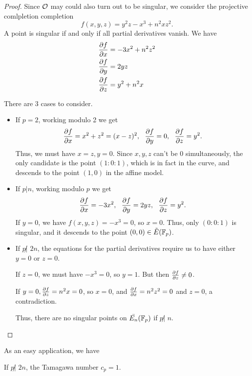 \documentclass[12pt, a4paper]{amsart}
\begin{document}
\begin{proof}
  Since ${\mathcal O}$ may could also turn out to be singular, we consider
  the projective comlpletion completion
  \[f(x,y,z) = y^2z - x^3 + n^2 xz^2.\]
  A point is singular if and only if all partial derivatives vanish.
  We have
  \begin{equation*}
    \begin{split}
      \frac{\partial f}{\partial x} &= -3x^2 + n^2z^2 \\
      \frac{\partial f}{\partial y} &= 2yz \\
      \frac{\partial f}{\partial z} &= y^2 + n^2x
    \end{split}
  \end{equation*}
 
  There are 3 cases to consider.
  
  \begin{itemize}
  \item If $p = 2$, working modulo 2 we get
    \[\frac{\partial f}{\partial x} = x^2+z^2 = (x-z)^2, \,\,\,\,
      \frac{\partial f}{\partial y} = 0, \,\,\,\,
      \frac{\partial f}{\partial z} = y^2.\]
    Thus, we must have $x = z, y = 0$. Since $x, y, z$ can't be 0
    simultaneously, the only candidate is the point $(1:0:1)$, which
    is in fact in the curve, and descends to the point $(1,0)$ in the
    affine model.
    
  \item If $p | n$, working modulo $p$ we get
    \[  \frac{\partial f}{\partial x} = -3x^2, \,\,\,\,
        \frac{\partial f}{\partial y} = 2yz, \,\,\,\,
        \frac{\partial f}{\partial z} = y^2.
      \]
    If $y = 0$, we have $f(x,y,z) = -x^3 = 0$, so $x = 0$.
    Thus,  only $(0:0:1)$ is singular, and it descends to the point $(0,0) \in {\tilde{E}(\mathbb{F}_p)}$.

  \item If $p \not| \,\, 2n$, the equations for the partial derivatives
    require us to have either $y = 0$ or $z = 0$.
   
    If $z = 0$, we must have $-x^3 = 0$, so $y = 1$. But then $\frac{\partial f}{\partial z}
    \neq 0$.

    If $y = 0, \frac{\partial f}{\partial z} = n^2x = 0$, so $x = 0$, and $\frac{\partial f}{\partial x} =
    n^2z^2 = 0$ and $ z = 0$, a contradiction.

    Thus, there are no singular points on $\bar{E_n}(\mathbb{F}_p)$ if $p \not|
    \,\, n$. \qedhere
  \end{itemize}
\end{proof}

As an easy application, we have

\begin{cor}
  If $p \not| \,\, 2n$, the Tamagawa number $c_p = 1$.
\end{cor}
\end{document}
